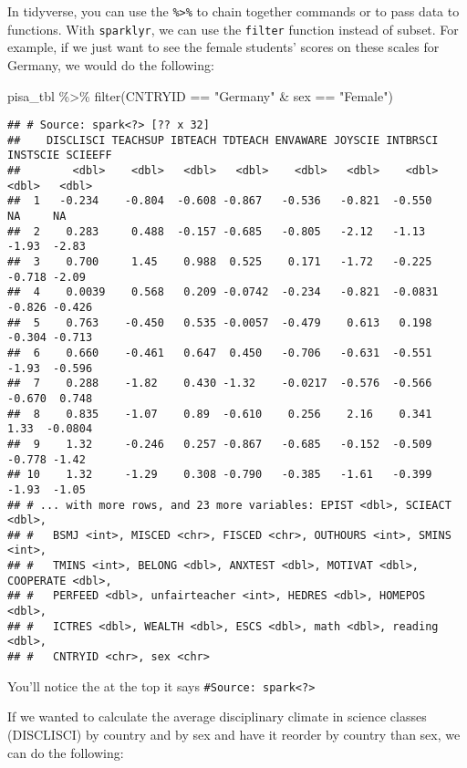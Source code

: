 \documentclass[
]{book}
\newenvironment{Shaded}{\begin{snugshade}}{\end{snugshade}}
\newcommand{\FunctionTok}[1]{\textcolor[rgb]{0.00,0.00,0.00}{#1}}
\newcommand{\NormalTok}[1]{#1}
\newcommand{\SpecialCharTok}[1]{\textcolor[rgb]{0.00,0.00,0.00}{#1}}
\newcommand{\StringTok}[1]{\textcolor[rgb]{0.31,0.60,0.02}{#1}}
\begin{document}
In tidyverse, you can use the \texttt{\%\textgreater{}\%} to chain together commands or to pass data to functions. With \texttt{sparklyr}, we can use the \texttt{filter} function instead of subset. For example, if we just want to see the female students' scores on these scales for Germany, we would do the following:

\begin{Shaded}
\begin{Highlighting}[]
\NormalTok{pisa\_tbl }\SpecialCharTok{\%\textgreater{}\%} 
  \FunctionTok{filter}\NormalTok{(CNTRYID }\SpecialCharTok{==} \StringTok{"Germany"} \SpecialCharTok{\&}\NormalTok{ sex }\SpecialCharTok{==} \StringTok{"Female"}\NormalTok{)}
\end{Highlighting}
\end{Shaded}

\begin{verbatim}
## # Source: spark<?> [?? x 32]
##    DISCLISCI TEACHSUP IBTEACH TDTEACH ENVAWARE JOYSCIE INTBRSCI INSTSCIE SCIEEFF
##        <dbl>    <dbl>   <dbl>   <dbl>    <dbl>   <dbl>    <dbl>    <dbl>   <dbl>
##  1   -0.234    -0.804  -0.608 -0.867   -0.536   -0.821  -0.550    NA     NA     
##  2    0.283     0.488  -0.157 -0.685   -0.805   -2.12   -1.13     -1.93  -2.83  
##  3    0.700     1.45    0.988  0.525    0.171   -1.72   -0.225    -0.718 -2.09  
##  4    0.0039    0.568   0.209 -0.0742  -0.234   -0.821  -0.0831   -0.826 -0.426 
##  5    0.763    -0.450   0.535 -0.0057  -0.479    0.613   0.198    -0.304 -0.713 
##  6    0.660    -0.461   0.647  0.450   -0.706   -0.631  -0.551    -1.93  -0.596 
##  7    0.288    -1.82    0.430 -1.32    -0.0217  -0.576  -0.566    -0.670  0.748 
##  8    0.835    -1.07    0.89  -0.610    0.256    2.16    0.341     1.33  -0.0804
##  9    1.32     -0.246   0.257 -0.867   -0.685   -0.152  -0.509    -0.778 -1.42  
## 10    1.32     -1.29    0.308 -0.790   -0.385   -1.61   -0.399    -1.93  -1.05  
## # ... with more rows, and 23 more variables: EPIST <dbl>, SCIEACT <dbl>,
## #   BSMJ <int>, MISCED <chr>, FISCED <chr>, OUTHOURS <int>, SMINS <int>,
## #   TMINS <int>, BELONG <dbl>, ANXTEST <dbl>, MOTIVAT <dbl>, COOPERATE <dbl>,
## #   PERFEED <dbl>, unfairteacher <int>, HEDRES <dbl>, HOMEPOS <dbl>,
## #   ICTRES <dbl>, WEALTH <dbl>, ESCS <dbl>, math <dbl>, reading <dbl>,
## #   CNTRYID <chr>, sex <chr>
\end{verbatim}

You'll notice the at the top it says \texttt{\#Source:\ spark\textless{}?\textgreater{}}

If we wanted to calculate the average disciplinary climate in science classes (DISCLISCI) by country and by sex and have it reorder by country than sex, we can do the following:
\end{document}
